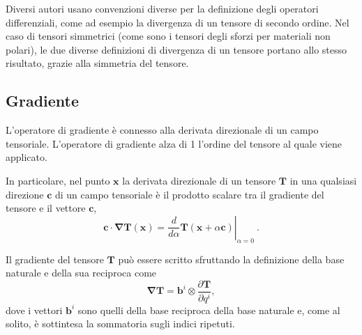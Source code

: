 \begin{remark}
 Diversi autori usano convenzioni diverse per la definizione degli operatori differenziali, come ad esempio la divergenza di un tensore di secondo ordine. Nel caso di tensori simmetrici (come sono i tensori degli sforzi per materiali non polari), le due diverse definizioni di divergenza di un tensore portano allo stesso risultato, grazie alla simmetria del tensore. 
\end{remark}

\subsection{Gradiente}
L'operatore di gradiente è connesso alla derivata direzionale di un campo tensoriale.
L'operatore di gradiente alza di 1 l'ordine del tensore al quale viene applicato.
\begin{operator}[Gradiente] 
    In particolare, nel punto $\bm{x}$ la derivata direzionale di un tensore $\bm{T}$ in una qualsiasi direzione $\bm{c}$ di un campo tensoriale è il prodotto scalare tra il gradiente del tensore e il vettore $\bm{c}$,
 \begin{equation}\label{eqn:grad:def}
   \bm{c} \cdot \bm{\nabla} \bm{T}(\bm{x}) = \left. \dfrac{d}{d\alpha} \bm{T}(\bm{x}+\alpha\bm{c})\right|_{\alpha=0} \ .
 \end{equation}
\end{operator}
%
\noindent
Il gradiente del tensore $\bm{T}$ può essere scritto sfruttando la definizione della base naturale e della sua reciproca come
 \begin{equation}\label{eqn:grad:natural}
  \bm{\nabla} \bm{T} = \bm{b}^i \otimes \dfrac{\partial \bm{T}}{\partial q^i} ,
 \end{equation}
dove i vettori $\bm{b}^i$ sono quelli della base reciproca della base naturale e, come al solito, è sottintesa la sommatoria sugli indici ripetuti.
